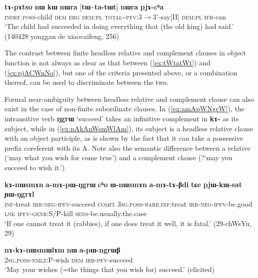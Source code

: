 \documentclass[oneside,a4paper,11pt]{article}
\newcommand{\ipa}[1]{\textbf{\phon#1}} %
\newcommand{\jpg}[2]{\ipa{#1} `#2'} %
\newcommand{\tld}{\textasciitilde{}}
\begin{document}
\begin{exe}
\ex \label{ex:tWtatWt}
\gll 
\ipa{tɤ-pɤtso} 	\ipa{nɯ} \ipa{kɯ}	\ipa{nɯra} 	[\ipa{tɯ\tld{}ta-tɯt}] 	\ipa{nɯra} 	\ipa{pjɤ-cʰa} \\
\textsc{indef.poss}-child \textsc{dem} \textsc{erg} \textsc{dem:pl} \textsc{total\tld{}pfv}:3$\rightarrow$3'-say[II] \textsc{dem:pl} \textsc{ifr}-can \\
\glt `The child had succeeded in doing everything that (the old king) had said.' (140428 yonggan de xiaocaifeng, 256)
\end{exe}

The contrast between finite headless relative and complement clauses in object function is not always as clear as that between (\ref{ex:tWtatWt}) and (\ref{ex:pjACWnNo}), but one of the criteria presented above, or a combination thereof, can be used to discriminate between the two.

Formal near-ambiguity between headless relative and complement clause can also exist in the case of non-finite subordinate clauses. In (\ref{ex:amApWNgrW}), the intransitive verb \jpg{ŋgrɯ}{succeed} takes an infinitive complement in \ipa{kɤ-} as its subject, while in (\ref{ex:nAkAnWsmWlAm}), its subject is a headless relative clause with an object participle, as is shown by the fact that it can take a possessive prefix coreferent with its A. Note also the semantic difference between a relative (`may what you wish for come true') and a complement clause (?`may you succeed to wish it.').

\begin{exe}
\ex \label{ex:amApWNgrW}
\gll 
\ipa{kɤ-nɯsmɤn} 	\ipa{a-mɤ-pɯ-ŋgrɯ} 	\ipa{cʰo} 	\ipa{ɯ-nɯsmɤn} 	\ipa{a-mɤ-tɤ-βdi} 	\ipa{tɕe} 	\ipa{pjɯ-kɯ-sat} 	\ipa{ɲɯ-ŋgrɤl} \\
\textsc{inf}-treat \textsc{irr-neg-ipfv}-succeed \textsc{comit} \textsc{3sg.poss-bare.inf}:treat  \textsc{irr-neg-ipfv}-be.good \textsc{lnk} \textsc{ipfv-genr:S/P}-kill \textsc{sens}-be.usually.the.case \\
\glt `If one cannot treat it (rabbies), if one does treat it well, it is fatal.' (29-chWsYu, 29)
\end{exe}

\begin{exe}
\ex \label{ex:nAkAnWsmWlAm}
\gll   \ipa{nɤ-kɤ-nɯsmɯlɤm} 	\ipa{nɯ} 	\ipa{a-pɯ-ngrɯβ} \\
\textsc{2sg.poss-nmlz:P}-wish \textsc{dem} \textsc{irr-pfv}-succeed \\
\glt `May your wishes (=the things that you wish for) succeed.' (elicited)
\end{exe}  
\end{document}
